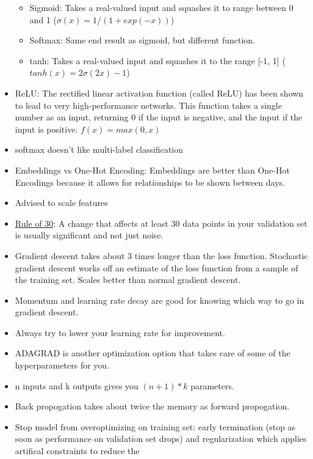 \documentclass[]{book}
\begin{document}
\begin{itemize}
  \begin{itemize}
  \item
    Sigmoid: Takes a real-valued input and squashes it to range between
    0 and 1 (\(σ(x) = 1 / (1 + exp(−x))\))
  \item
    Softmax: Same end result as sigmoid, but different function.
  \item
    tanh: Takes a real-valued input and squashes it to the range {[}-1,
    1{]} (\(tanh(x) = 2σ(2x) − 1\))
  \end{itemize}
\item
  ReLU: The rectified linear activation function (called ReLU) has been
  shown to lead to very high-performance networks. This function takes a
  single number as an input, returning 0 if the input is negative, and
  the input if the input is positive. \(f(x) = max(0, x)\)
\item
  softmax doesn't like multi-label classification
\item
  Embeddings vs One-Hot Encoding: Embeddings are better than One-Hot
  Encodings because it allows for relationships to be shown between
  days.
\item
  Advised to scale features
\item
  \href{https://www.youtube.com/watch?v=nqEYVzJLR_c\&feature=youtu.be\&t=31}{Rule
  of 30}: A change that affects at least 30 data points in your
  validation set is usually significant and not just noise.
\item
  Gradient descent takes about 3 times longer than the loss function.
  Stochastic gradient descent works off an estimate of the loss function
  from a sample of the training set. Scales better than normal gradient
  descent.
\item
  Momentum and learning rate decay are good for knowing which way to go
  in gradient descent.
\item
  Always try to lower your learning rate for improvement.
\item
  ADAGRAD is another optimization option that takes care of some of the
  hyperparameters for you.
\item
  n inputs and k outputs gives you \((n+1)*k\) parameters.
\item
  Back propogation takes about twice the memory as forward propogation.
\item
  Stop model from overoptimizing on training set: early termination
  (stop as soon as performance on validation set drops) and
  regularization which applies artifical constraints to reduce the

\end{itemize}
\end{document}

